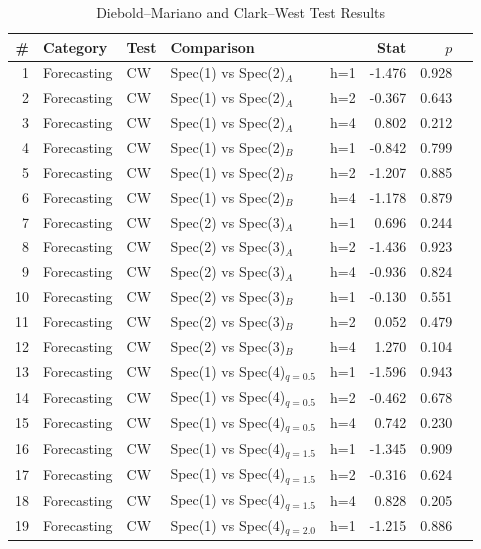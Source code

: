\begin{table}[htbp]
\centering
\caption{Diebold--Mariano and Clark--West Test Results}
\label{tab:test_results}
\footnotesize
\begin{tabular}{rllllrrl}
\toprule
\# & Category & Test & Comparison & & Stat & $p$ & \\
\midrule
  1 & Forecasting & CW & Spec(1) vs Spec(2)$_{A}$ & h=1 & -1.476 & 0.928 &  \\
  2 & Forecasting & CW & Spec(1) vs Spec(2)$_{A}$ & h=2 & -0.367 & 0.643 &  \\
  3 & Forecasting & CW & Spec(1) vs Spec(2)$_{A}$ & h=4 & 0.802 & 0.212 &  \\
  4 & Forecasting & CW & Spec(1) vs Spec(2)$_{B}$ & h=1 & -0.842 & 0.799 &  \\
  5 & Forecasting & CW & Spec(1) vs Spec(2)$_{B}$ & h=2 & -1.207 & 0.885 &  \\
  6 & Forecasting & CW & Spec(1) vs Spec(2)$_{B}$ & h=4 & -1.178 & 0.879 &  \\
  7 & Forecasting & CW & Spec(2) vs Spec(3)$_{A}$ & h=1 & 0.696 & 0.244 &  \\
  8 & Forecasting & CW & Spec(2) vs Spec(3)$_{A}$ & h=2 & -1.436 & 0.923 &  \\
  9 & Forecasting & CW & Spec(2) vs Spec(3)$_{A}$ & h=4 & -0.936 & 0.824 &  \\
  10 & Forecasting & CW & Spec(2) vs Spec(3)$_{B}$ & h=1 & -0.130 & 0.551 &  \\
  11 & Forecasting & CW & Spec(2) vs Spec(3)$_{B}$ & h=2 & 0.052 & 0.479 &  \\
  12 & Forecasting & CW & Spec(2) vs Spec(3)$_{B}$ & h=4 & 1.270 & 0.104 &  \\
  13 & Forecasting & CW & Spec(1) vs Spec(4)$_{q=0.5}$ & h=1 & -1.596 & 0.943 &  \\
  14 & Forecasting & CW & Spec(1) vs Spec(4)$_{q=0.5}$ & h=2 & -0.462 & 0.678 &  \\
  15 & Forecasting & CW & Spec(1) vs Spec(4)$_{q=0.5}$ & h=4 & 0.742 & 0.230 &  \\
  16 & Forecasting & CW & Spec(1) vs Spec(4)$_{q=1.5}$ & h=1 & -1.345 & 0.909 &  \\
  17 & Forecasting & CW & Spec(1) vs Spec(4)$_{q=1.5}$ & h=2 & -0.316 & 0.624 &  \\
  18 & Forecasting & CW & Spec(1) vs Spec(4)$_{q=1.5}$ & h=4 & 0.828 & 0.205 &  \\
  19 & Forecasting & CW & Spec(1) vs Spec(4)$_{q=2.0}$ & h=1 & -1.215 & 0.886 &  \\

\end{tabular}
\end{table}
